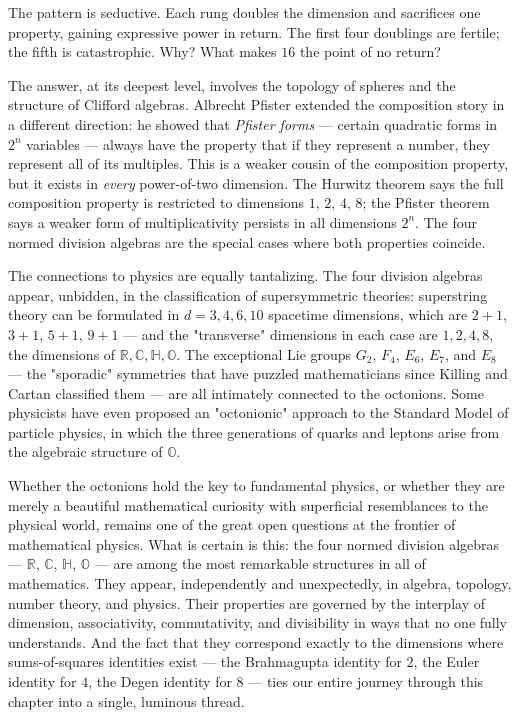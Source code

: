 \documentclass[11pt,twoside,openright]{book}
\theoremstyle{definition}
\theoremstyle{remark}
\begin{document}
The pattern is seductive. Each rung doubles the dimension and sacrifices one property, gaining expressive power in return. The first four doublings are fertile; the fifth is catastrophic. Why? What makes $16$ the point of no return?

The answer, at its deepest level, involves the topology of spheres and the structure of Clifford algebras. Albrecht Pfister extended the composition story in a different direction: he showed that \textit{Pfister forms} --- certain quadratic forms in $2^n$ variables --- always have the property that if they represent a number, they represent all of its multiples. This is a weaker cousin of the composition property, but it exists in \textit{every} power-of-two dimension. The Hurwitz theorem says the full composition property is restricted to dimensions $1$, $2$, $4$, $8$; the Pfister theorem says a weaker form of multiplicativity persists in all dimensions $2^n$. The four normed division algebras are the special cases where both properties coincide.

The connections to physics are equally tantalizing. The four division algebras appear, unbidden, in the classification of supersymmetric theories: superstring theory can be formulated in $d = 3, 4, 6, 10$ spacetime dimensions, which are $2 + 1$, $3 + 1$, $5 + 1$, $9 + 1$ --- and the "transverse" dimensions in each case are $1, 2, 4, 8$, the dimensions of $\mathbb{R}, \mathbb{C}, \mathbb{H}, \mathbb{O}$. The exceptional Lie groups $G_2$, $F_4$, $E_6$, $E_7$, and $E_8$ --- the "sporadic" symmetries that have puzzled mathematicians since Killing and Cartan classified them --- are all intimately connected to the octonions. Some physicists have even proposed an "octonionic" approach to the Standard Model of particle physics, in which the three generations of quarks and leptons arise from the algebraic structure of $\mathbb{O}$.


Whether the octonions hold the key to fundamental physics, or whether they are merely a beautiful mathematical curiosity with superficial resemblances to the physical world, remains one of the great open questions at the frontier of mathematical physics. What is certain is this: the four normed division algebras --- $\mathbb{R}$, $\mathbb{C}$, $\mathbb{H}$, $\mathbb{O}$ --- are among the most remarkable structures in all of mathematics. They appear, independently and unexpectedly, in algebra, topology, number theory, and physics. Their properties are governed by the interplay of dimension, associativity, commutativity, and divisibility in ways that no one fully understands. And the fact that they correspond exactly to the dimensions where sums-of-squares identities exist --- the Brahmagupta identity for $2$, the Euler identity for $4$, the Degen identity for $8$ --- ties our entire journey through this chapter into a single, luminous thread.
\end{document}
